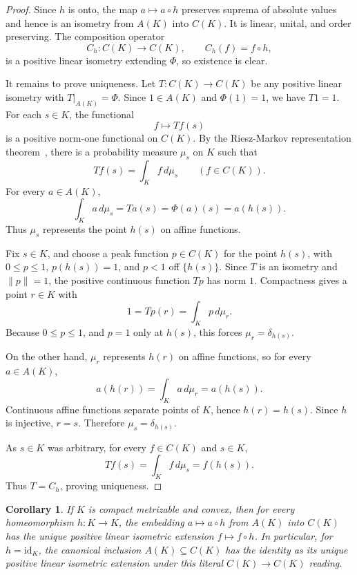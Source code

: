 \documentclass[11pt]{amsart}
\newtheorem{corollary}{Corollary}
\theoremstyle{definition}
\begin{document}
\begin{proof}
Since \(h\) is onto, the map \(a\mapsto a\circ h\) preserves suprema of
absolute values and hence is an isometry from \(A(K)\) into \(C(K)\).  It is
linear, unital, and order preserving.  The composition operator
\[
  C_h:C(K)\to C(K),\qquad C_h(f)=f\circ h,
\]
is a positive linear isometry extending \(\Phi\), so existence is clear.

It remains to prove uniqueness.  Let \(T:C(K)\to C(K)\) be any positive linear
isometry with \(T|_{A(K)}=\Phi\).  Since \(1\in A(K)\) and \(\Phi(1)=1\), we
have \(T1=1\).  For each \(s\in K\), the functional
\[
  f\longmapsto Tf(s)
\]
is a positive norm-one functional on \(C(K)\).  By the Riesz-Markov
representation theorem~\cite[Theorem 7.17]{Rudin}, there is a probability
measure \(\mu_s\) on \(K\) such that
\[
  Tf(s)=\int_K f\,d\mu_s\qquad(f\in C(K)).
\]
For every \(a\in A(K)\),
\[
  \int_K a\,d\mu_s = T a(s)=\Phi(a)(s)=a(h(s)).
\]
Thus \(\mu_s\) represents the point \(h(s)\) on affine functions.

Fix \(s\in K\), and choose a peak function \(p\in C(K)\) for the point
\(h(s)\), with \(0\leq p\leq 1\), \(p(h(s))=1\), and \(p<1\) off
\(\{h(s)\}\).  Since \(T\) is an isometry and \(\|p\|=1\), the positive
continuous function \(Tp\) has norm \(1\).  Compactness gives a point \(r\in K\)
with
\[
  1=Tp(r)=\int_K p\,d\mu_r.
\]
Because \(0\leq p\leq 1\), and \(p=1\) only at \(h(s)\), this forces
\(\mu_r=\delta_{h(s)}\).

On the other hand, \(\mu_r\) represents \(h(r)\) on affine functions, so for
every \(a\in A(K)\),
\[
  a(h(r))=\int_K a\,d\mu_r=a(h(s)).
\]
Continuous affine functions separate points of \(K\), hence \(h(r)=h(s)\).
Since \(h\) is injective, \(r=s\).  Therefore \(\mu_s=\delta_{h(s)}\).

As \(s\in K\) was arbitrary, for every \(f\in C(K)\) and \(s\in K\),
\[
  Tf(s)=\int_K f\,d\mu_s=f(h(s)).
\]
Thus \(T=C_h\), proving uniqueness.
\end{proof}

\begin{corollary}
If \(K\) is compact metrizable and convex, then for every homeomorphism
\(h:K\to K\), the embedding \(a\mapsto a\circ h\) from \(A(K)\) into \(C(K)\)
has the unique positive linear isometric extension \(f\mapsto f\circ h\).
In particular, for \(h=\mathrm{id}_K\), the canonical inclusion
\(A(K)\subseteq C(K)\) has the identity as its unique positive linear
isometric extension under this literal \(C(K)\to C(K)\) reading.
\end{corollary}
\end{document}
